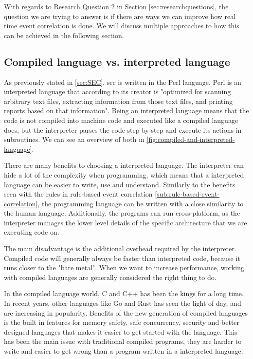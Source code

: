 With regards to Research Question 2 in Section \cref{sec:researchquestions}, the question we are trying to answer is if there are ways we can improve how real time event correlation is done. We will discuss multiple approaches to how this can be achieved in the following section.

\subsection{Compiled language vs. interpreted language}
\label{sub:use-compiled-language}


As previously stated in \cref{sec:SEC}, \acrshort{sec} is written in the Perl language. Perl is an interpreted language that according to its creator \textcite{wall1994perl} is "optimized for scanning arbitrary text files, extracting information from those text files, and printing reports based on that information". Being an interpreted language means that the code is not compiled into machine code and executed like a compiled language does, but the interpreter parses the code step-by-step and execute its actions in subroutines. We can see an overview of both in \cref{fig:compiled-and-interpreted-language}.


There are many benefits to choosing a interpreted language. The interpreter can hide a lot of the complexity when programming, which means that a interpreted language can be easier to write, use and understand. Similarly to the benefits seen with the rules in rule-based event correlation \cref{sub:rule-based-event-correlation}, the programming language can be written with a close similarity to the human language. Additionally, the programs can run cross-platform, as the interpreter manages the lower level details of the specific architecture that we are executing code on.

The main disadvantage is the additional overhead required by the interpreter. Compiled code will generally always be faster than interpreted code, because it runs closer to the "bare metal". When we want to increase performance, working with compiled languages are generally considered the right thing to do.

In the compiled language world, C and C++ has been the kings for a long time. In recent years, other languages like Go \cite{golang} and Rust \cite{Rust} has seen the light of day, and are increasing in popularity. Benefits of the new generation of compiled languages is the built in features for memory safety, safe concurrency, security and better designed languages that makes it easier to get started with the language. This has been the main issue with traditional compiled programs, they are harder to write and easier to get wrong than a program written in a interpreted language.

